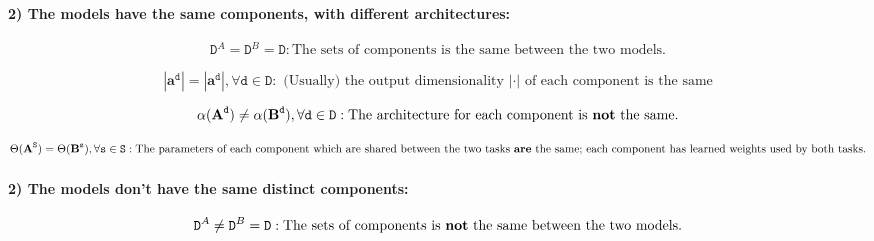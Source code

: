 \paragraph{2) The models have the same components, with different architectures:}


\begin{equation}
    \mathtt{D}^A = \mathtt{D}^B = \mathtt{D} : \text{The sets of components is the same between the two models.}
\end{equation}


\begin{equation}
    |\textbf{a}^\mathtt{d}| = |\textbf{a}^\mathtt{d}|, \forall \mathtt{d} \in \mathtt{D} : \text{ (Usually) the output dimensionality $|\cdot|$ of each component is the same}
\end{equation}


\begin{equation}
    \alpha(\textbf{A}^\mathtt{d}) \neq \alpha(\textbf{B}^\mathtt{d}), \forall \mathtt{d} \in \mathtt{D} : \text{The architecture for each component is \textbf{not} the same.}
\end{equation}
    

\begin{equation}
    \Theta(\textbf{A}^\mathtt{S}) = \Theta(\textbf{B}^\mathtt{s}) , \forall \mathtt{s} \in \mathtt{S} : \text{The parameters of each component which are shared between the two tasks  \textbf{are} the same;  each component has learned  weights used by both tasks.}
\end{equation}

\paragraph{2) The models don't have the same distinct components:}


\begin{equation}
    \mathtt{D}^A \neq \mathtt{D}^B = \mathtt{D} : \text{The sets of components is \textbf{not} the same between the two models.}
\end{equation}


